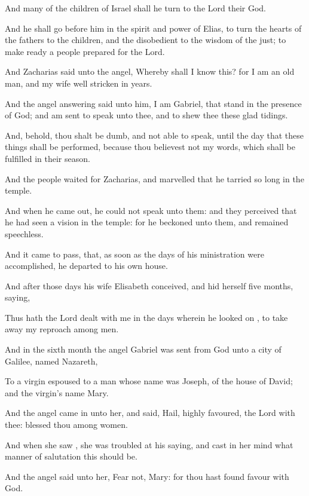 {And
many of the
children of
Israel shall he
turn
to the
Lord
their
God.

And
he shall
go
before
him
in the
spirit
and
power of
Elias, to
turn the
hearts of the
fathers
to the
children,
and the
disobedient
to the
wisdom of the
just; to make
ready a
people
prepared for the
Lord.

And
Zacharias
said
unto the
angel,
Whereby shall I
know
this?
for
I
am an old
man,
and
my
wife well
stricken
in
years.

And the
angel
answering
said unto
him,
I
am
Gabriel,
that
stand in the
presence of
God;
and am
sent to
speak
unto
thee,
and to
shew
thee
these glad
tidings.

And,
behold, thou shalt
be
dumb,
and
not
able to
speak,
until the
day
that these
things shall be
performed,
because thou
believest
not
my
words,
which shall be
fulfilled
in
their
season.

And the
people
waited for
Zacharias,
and
marvelled
that
he tarried so
long
in the
temple.

And when he came
out, he
could
not
speak unto
them:
and they
perceived
that he had
seen a
vision
in the
temple:
for
he
beckoned unto
them,
and
remained
speechless.

And it came to
pass, that, as soon
as the
days
of
his
ministration were
accomplished, he
departed
to his
own
house.

And
after
those
days
his
wife
Elisabeth
conceived,
and
hid
herself
five
months,
saying,

Thus
hath the
Lord
dealt with
me
in the
days
wherein he looked
on
{}, to take
away
my
reproach
among
men.

And
in the
sixth
month the
angel
Gabriel was
sent
from
God
unto a
city of
Galilee,
named
Nazareth,

To a
virgin
espoused to a
man
whose name
was
Joseph,
of the
house of
David;
and the
virgin’s
name
{}
Mary.

And the
angel came
in
unto
her, and
said,
Hail,
{} highly
favoured, the
Lord
{}
with
thee:
blessed
{}
thou
among
women.

And when she
saw
{}, she was
troubled
at
his
saying,
and cast in her
mind what manner
of
salutation
this should
be.

And the
angel
said unto
her,
Fear
not,
Mary:
for thou hast
found
favour
with
God.

}
